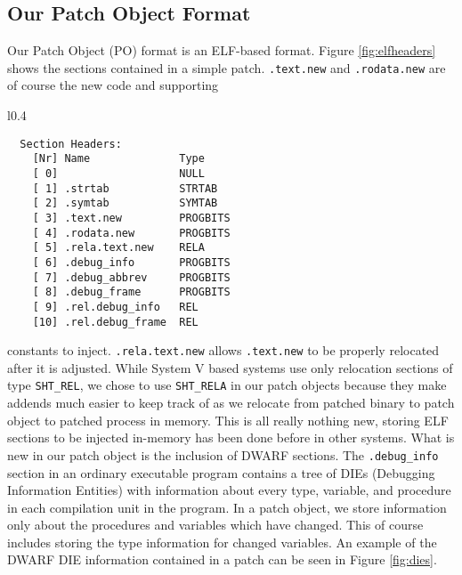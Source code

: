 \documentclass[a4paper,12pt]{article}
\begin{document}
\subsection{Our Patch Object Format}
Our Patch Object (PO) format is an ELF-based
format. Figure \ref{fig:elfheaders} shows the sections contained in a
simple patch. \texttt{.text.new} and \texttt{.rodata.new} are of
course the new code and supporting
\begin{wrapfigure}{l}{0.4\textwidth}
{\footnotesize
\begin{verbatim}
  Section Headers:
    [Nr] Name              Type          
    [ 0]                   NULL          
    [ 1] .strtab           STRTAB        
    [ 2] .symtab           SYMTAB        
    [ 3] .text.new         PROGBITS      
    [ 4] .rodata.new       PROGBITS      
    [ 5] .rela.text.new    RELA          
    [ 6] .debug_info       PROGBITS      
    [ 7] .debug_abbrev     PROGBITS      
    [ 8] .debug_frame      PROGBITS      
    [ 9] .rel.debug_info   REL           
    [10] .rel.debug_frame  REL           
\end{verbatim}
}
\caption{Headers for the PO}
\label{fig:elfheaders}
\vspace{-10pt}
\end{wrapfigure}
constants to inject. \texttt{.rela.text.new} allows \texttt{.text.new}
to be properly relocated after it is adjusted. While System V based
systems use only relocation sections of type \texttt{SHT\_REL}, we
chose to use \texttt{SHT\_RELA} in our patch objects because they make
addends much easier to keep track of as we relocate from patched
binary to patch object to patched process in memory. This is all
really nothing new, storing ELF sections to be injected in-memory has
been done before in other systems. What is new in our patch object is
the inclusion of DWARF sections. The \texttt{.debug\_info} section in
an ordinary executable program contains a tree of DIEs (Debugging
Information Entities) with information about every type, variable, and
procedure in each compilation unit in the program. In a patch object,
we store information only about the procedures and variables which
have changed. This of course includes storing the type information for
changed variables. An example of the DWARF DIE information contained
in a patch can be seen in Figure \ref{fig:dies}.
\end{document}
